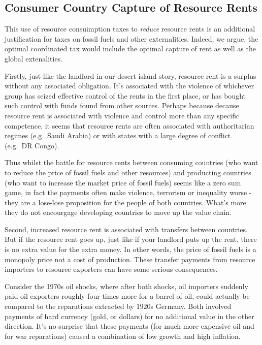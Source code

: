 \documentclass[]{tufte-handout}
\begin{document}
\hypertarget{consumer-country-capture-of-resource-rents}{%
\subsection{Consumer Country Capture of Resource
Rents}\label{consumer-country-capture-of-resource-rents}}

This use of resource consuimption taxes to \emph{reduce} resource rents
is an additional justification for taxes on fossil fuels and other
externalities. Indeed, we argue, the optimal coordinated tax would
include the optimal capture of rent as well as the global extenalities.

Firstly, just like the landlord in our desert island story, resource
rent is a surplus without any associated obligation. It's associated
with the violence of whichever group has seized effective control of the
rents in the first place, or has bought such control with funds found
from other sources. Perhaps because decause resource rent is associated
with violence and control more than any specific competence, it seems
that resource rents are often associated with authoritarian regimes
(e.g.~Saudi Arabia) or with states with a large degree of conflict
(e.g.~DR Congo).

Thus whilst the battle for resource rents between consuming countries
(who want to reduce the price of fossil fuels and other resources) and
producting countries (who want to increase the market price of fossil
fuels) seems like a zero sum game, in fact the payments often make
violence, terrorism or inequality worse - they are a lose-lose
proposition for the people of both countries. What's more they do not
encourgage developing countries to move up the value chain.

Second, increased resource rent is associated with transfers between
countries. But if the resource rent goes up, just like if your landlord
puts up the rent, there is no extra value for the extra money. In other
words, the price of fossil fuels is a monopoly price not a cost of
production. These transfer payments from resource importers to resource
exporters can have some serious consequences.

Consider the 1970s oil shocks, where after both shocks, oil importers
suddenly paid oil exporters roughly four times more for a barrel of oil,
could actually be compared to the reparations extracted by 1920s
Germany. Both involved payments of hard currency (gold, or dollars) for
no additional value in the other direction. It's no surprise that these
payments (for much more expensive oil and for war reparations) caused a
combination of low growth and high inflation.
\end{document}
